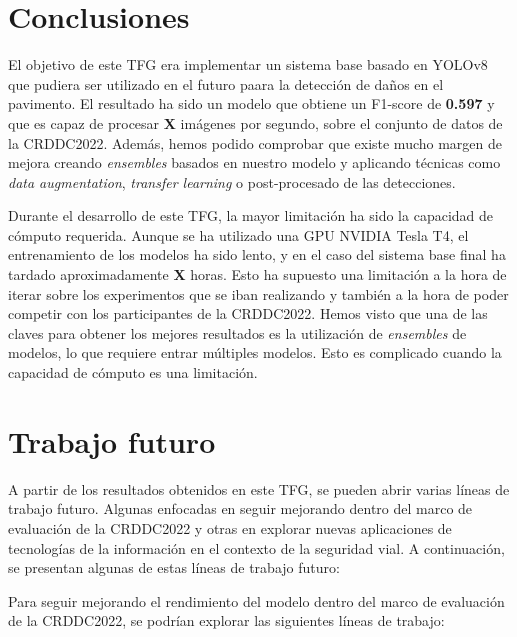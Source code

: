 
\section{Conclusiones\label{SEC:CONC}}
El objetivo de este TFG era implementar un sistema base basado en YOLOv8 que pudiera ser utilizado en el futuro paara la detección de daños en el pavimento. El resultado ha sido un modelo que obtiene un F1-score de \textbf{0.597} y que es capaz de procesar \textbf{X} imágenes por segundo, sobre el conjunto de datos de la CRDDC2022. Además, hemos podido comprobar que existe mucho margen de mejora creando \textit{ensembles} basados en nuestro modelo y aplicando técnicas como \textit{data augmentation}, \textit{transfer learning} o post-procesado de las detecciones.

Durante el desarrollo de este TFG, la mayor limitación ha sido la capacidad de cómputo requerida. Aunque se ha utilizado una GPU NVIDIA Tesla T4, el entrenamiento de los modelos ha sido lento, y en el caso del sistema base final ha tardado aproximadamente \textbf{X} horas. Esto ha supuesto una limitación a la hora de iterar sobre los experimentos que se iban realizando y también a la hora de poder competir con los participantes de la CRDDC2022. Hemos visto que una de las claves para obtener los mejores resultados es la utilización de \textit{ensembles} de modelos, lo que requiere entrar múltiples modelos. Esto es complicado cuando la capacidad de cómputo es una limitación.


\section{Trabajo futuro\label{SEC:TRABFUT}}
A partir de los resultados obtenidos en este TFG, se pueden abrir varias líneas de trabajo futuro. Algunas enfocadas en seguir mejorando dentro del marco de evaluación de la CRDDC2022 y otras en explorar nuevas aplicaciones de tecnologías de la información en el contexto de la seguridad vial. A continuación, se presentan algunas de estas líneas de trabajo futuro:

Para seguir mejorando el rendimiento del modelo dentro del marco de evaluación de la CRDDC2022, se podrían explorar las siguientes líneas de trabajo:

